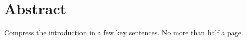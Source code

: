 
 \setcounter{tocdepth}{2}
 \tableofcontents
 \clearpage






\chapter*{Abstract}

  Compress the introduction in a few key sentences. No more than half a page.

 \cleardoublepage




